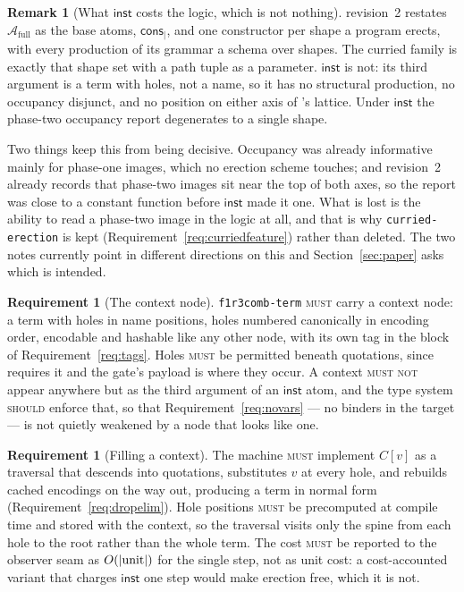 \documentclass[11pt,a4paper]{article}
\newcommand{\code}[1]{\texttt{#1}}
\newcommand{\MUST}{\textsc{must}}
\newcommand{\MUSTNOT}{\textsc{must not}}
\newcommand{\SHOULD}{\textsc{should}}
\newcommand{\cons}{\mathsf{cons}}
\newcommand{\Atm}{\mathcal{A}}
\newcommand{\inst}{\mathsf{inst}}
\theoremstyle{definition}
\newtheorem{requirement}[definition]{Requirement}
\newtheorem{remark}[definition]{Remark}
\theoremstyle{plain}
\begin{document}
\begin{remark}[What $\inst$ costs the logic, which is not nothing]
\label{rem:logiccost}
\cite{logic} revision~2 restates $\Atm_{\mathrm{full}}$ as the base atoms,
$\cons_{\mid}$, and one constructor per shape a program erects, with every
production of its grammar a schema over shapes. The curried family is exactly
that shape set with a path tuple as a parameter. $\inst$ is not: its third
argument is a term with holes, not a name, so it has no structural production,
no occupancy disjunct, and no position on either axis of
\cite[\S9]{draft3}'s lattice. Under $\inst$ the phase-two occupancy report
degenerates to a single shape.

Two things keep this from being decisive. Occupancy was already informative
mainly for phase-one images, which no erection scheme touches; and
\cite{logic} revision~2 already records that phase-two images sit near the top
of both axes, so the report was close to a constant function before $\inst$
made it one. What is lost is the ability to read a phase-two image in the
logic at all, and that is why \code{curried-erection} is kept
(Requirement~\ref{req:curriedfeature}) rather than deleted. The two notes
currently point in different directions on this and
Section~\ref{sec:paper} asks which is intended.
\end{remark}

\begin{requirement}[The context node]\label{req:contextnode}
\code{f1r3comb-term} \MUST{} carry a context node: a term with holes in name
positions, holes numbered canonically in encoding order, encodable and
hashable like any other node, with its own tag in the block of
Requirement~\ref{req:tags}. Holes \MUST{} be permitted beneath quotations,
since \cite[\S6.7]{draft3} requires it and the gate's payload is where they
occur. A context \MUSTNOT{} appear anywhere but as the third argument of an
$\inst$ atom, and the type system \SHOULD{} enforce that, so that
Requirement~\ref{req:novars} --- no binders in the target --- is not quietly
weakened by a node that looks like one.
\end{requirement}

\begin{requirement}[Filling a context]\label{req:instwork}
The machine \MUST{} implement $C[v]$ as a traversal that descends into
quotations, substitutes $v$ at every hole, and rebuilds cached encodings on
the way out, producing a term in normal form
(Requirement~\ref{req:dropelim}). Hole positions \MUST{} be precomputed at
compile time and stored with the context, so the traversal visits only the
spine from each hole to the root rather than the whole term. The cost \MUST{}
be reported to the observer seam as $O(|{\rm unit}|)$ for the single step, not
as unit cost: a cost-accounted variant that charges $\inst$ one step would
make erection free, which it is not.
\end{requirement}
\end{document}
